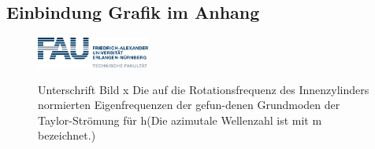  \subsection*{Einbindung Grafik im Anhang}
  \begin{figure}[h!]
  \begin{centering}
  {\includegraphics[width=0.33\textwidth]{Abbildungen/fau.png}}
   \caption{Unterschrift Bild x Die auf die Rotationsfrequenz des Innenzylinders normierten Eigenfrequenzen der gefun-denen Grundmoden der Taylor-Strömung für h(Die azimutale Wellenzahl ist mit m  bezeichnet.)}
  \end{centering}
  \end{figure}








